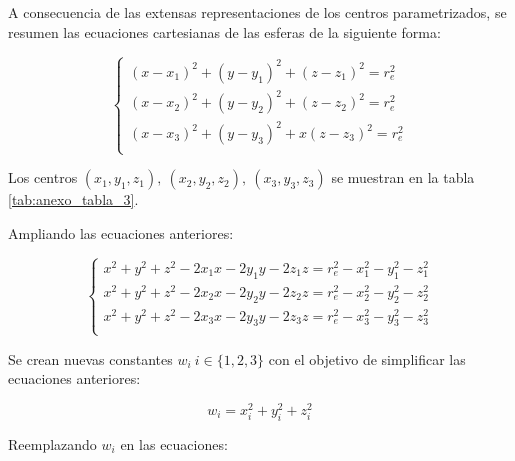         \newpage

        
        A consecuencia de las extensas representaciones de los centros parametrizados, se resumen las ecuaciones cartesianas de las esferas de la siguiente forma:
        
        \begin{equation*}
              \left\{ \begin{array}{c}
            	 \left( x-x_{1} \right) ^{2}+ \left( y-y_{1} \right) ^{2} + \left( z-z_{1} \right) ^{2}= r_{e}^{2}~\\
            	 \left( x-x_{2} \right) ^{2}+ \left( y-y_{2} \right) ^{2} + \left( z-z_{2} \right) ^{2}= r_{e}^{2}\\
            	 \left( x-x_{3} \right) ^{2}+ \left( y-y_{3} \right) ^{2} +x \left( z-z_{3} \right) ^{2}= r_{e}^{2}\\
            \end{array} \right.   
        \end{equation*}

        Los centros  $\left( x_{1},y_{1},z_{1} \right) ,~ \left( x_{2},y_{2},z_{2} \right) ,~ \left( x_{3},y_{3},z_{3} \right)$  se muestran en la tabla \ref{tab:anexo_tabla_3}.
        

        Ampliando las ecuaciones anteriores:
        
        \begin{equation*}
              \left\{ \begin{array}{c}
        	x^{2}+y^{2} +z^{2}-2x_{1}x-2y_{1}y-2z_{1}z = r_{e}^{2}- x_{1}^{2}- y_{1}^{2}-z_{1}^{2}\\
        	x^{2}+y^{2} +z^{2}-2x_{2}x-2y_{2}y-2z_{2}z = r_{e}^{2}- x_{2}^{2}- y_{2}^{2}-z_{2}^{2}\\
        	x^{2}+y^{2} +z^{2}-2x_{3}x-2y_{3}y-2z_{3}z = r_{e}^{2}- x_{3}^{2}- y_{3}^{2}-z_{3}^{2}\\
            \end{array} \right.   
        \end{equation*}
        
        Se crean nuevas constantes  $w_{i}~ i  \in  \{ 1,2,3 \}$  con el objetivo de simplificar las ecuaciones anteriores:
        
        \begin{equation*}
         w_{i}= x_{i}^{2}+y_{i}^{2} +z_{i}^{2}
        \end{equation*}

        Reemplazando $w_{i}$ en las ecuaciones:
        
